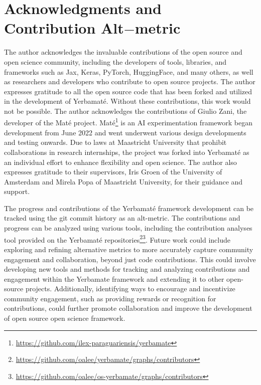 

\section{Acknowledgments and Contribution Alt$-$metric}

The author acknowledges the invaluable contributions of the open source and open science community, including the developers of tools, libraries, and frameworks such as Jax, Keras, PyTorch, HuggingFace, and many others, as well as researchers and developers who contribute to open source projects. The author expresses gratitude to all the open source code that has been forked and utilized in the development of Yerbamaté. Without these contributions, this work would not be possible.
The author acknowledges the contributions of Giulio Zani, the developer of the Maté project. Maté\footnote{\url{https://github.com/ilex-paraguariensis/yerbamate}} is an AI experimentation framework began development from June 2022 and went underwent various design developments and testing onwards. Due to laws at Maastricht University that prohibit collaborations in research internships, the project was forked into Yerbamaté as an individual effort to enhance flexibility and open science. 
The author also expresses gratitude to their supervisors, Iris Groen of the University of Amsterdam and Mirela Popa of Maastricht University, for their guidance and support. 

The progress and contributions of the Yerbamaté framework development can be tracked using the git commit history as an alt-metric. The contributions and progress can be analyzed using various tools, including the contribution analyses tool provided on the Yerbamaté repositories\footnote{\url{https://github.com/oalee/yerbamate/graphs/contributors}}\footnote{\url{https://github.com/oalee/os-yerbamate/graphs/contributors}}. Future work could include exploring and refining alternative metrics to more accurately capture community engagement and collaboration, beyond just code contributions. This could involve developing new tools and methods for tracking and analyzing contributions and engagement within the Yerbamate framework and extending it to other open-source projects. Additionally, identifying ways to encourage and incentivize community engagement, such as providing rewards or recognition for contributions, could further promote collaboration and improve the development of open source open science framework.


